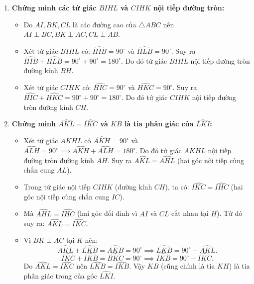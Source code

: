 \begin{ex}
{\begin{enumerate}[label=\textbf{\alph*)}]
    \item \textbf{Chứng minh các tứ giác $BIHL$ và $CIHK$ nội tiếp đường tròn:}
    \begin{itemize}
        \item Do $AI, BK, CL$ là các đường cao của $\triangle ABC$ nên $AI \perp BC, BK \perp AC, CL \perp AB$.
        \item Xét tứ giác $BIHL$ có: $\widehat{HIB} = 90^\circ$ và $\widehat{HLB} = 90^\circ$.
        Suy ra $\widehat{HIB} + \widehat{HLB} = 90^\circ + 90^\circ = 180^\circ$.
        Do đó tứ giác $BIHL$ nội tiếp đường tròn đường kính $BH$.
        \item Xét tứ giác $CIHK$ có: $\widehat{HIC} = 90^\circ$ và $\widehat{HKC} = 90^\circ$.
        Suy ra $\widehat{HIC} + \widehat{HKC} = 90^\circ + 90^\circ = 180^\circ$.
        Do đó tứ giác $CIHK$ nội tiếp đường tròn đường kính $CH$.
    \end{itemize}

    \item \textbf{Chứng minh $\widehat{AKL} = \widehat{IKC}$ và $KB$ là tia phân giác của $\widehat{LKI}$:}
    \begin{itemize}
        \item Xét tứ giác $AKHL$ có $\widehat{AKH} = 90^\circ$ và $\widehat{ALH} = 90^\circ \implies \widehat{AKH} + \widehat{ALH} = 180^\circ$.
        Do đó tứ giác $AKHL$ nội tiếp đường tròn đường kính $AH$.
        Suy ra $\widehat{AKL} = \widehat{AHL}$ (hai góc nội tiếp cùng chắn cung $AL$).
        \item Trong tứ giác nội tiếp $CIHK$ (đường kính $CH$), ta có:
        $\widehat{IKC} = \widehat{IHC}$ (hai góc nội tiếp cùng chắn cung $IC$).
        \item Mà $\widehat{AHL} = \widehat{IHC}$ (hai góc đối đỉnh vì $AI$ và $CL$ cắt nhau tại $H$).
        Từ đó suy ra: $\widehat{AKL} = \widehat{IKC}$.
        \item Vì $BK \perp AC$ tại $K$ nên:
        \[
        \widehat{AKL} + \widehat{LKB} = \widehat{AKB} = 90^\circ \implies \widehat{LKB} = 90^\circ - \widehat{AKL}.
        \]
        \[
        \widehat{IKC} + \widehat{IKB} = \widehat{BKC} = 90^\circ \implies \widehat{IKB} = 90^\circ - \widehat{IKC}.
        \]
        Do $\widehat{AKL} = \widehat{IKC}$ nên $\widehat{LKB} = \widehat{IKB}$.
        Vậy $KB$ (cũng chính là tia $KH$) là tia phân giác trong của góc $\widehat{LKI}$.
    \end{itemize}


\end{enumerate}}
\end{ex}
